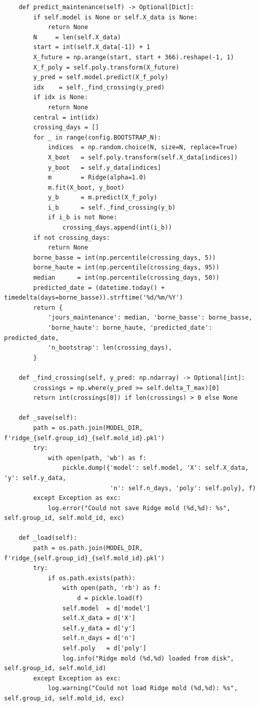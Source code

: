 \begin{lstlisting}
    def predict_maintenance(self) -> Optional[Dict]:
        if self.model is None or self.X_data is None:
            return None
        N     = len(self.X_data)
        start = int(self.X_data[-1]) + 1
        X_future = np.arange(start, start + 366).reshape(-1, 1)
        X_f_poly = self.poly.transform(X_future)
        y_pred = self.model.predict(X_f_poly)
        idx    = self._find_crossing(y_pred)
        if idx is None:
            return None
        central = int(idx)
        crossing_days = []
        for _ in range(config.BOOTSTRAP_N):
            indices  = np.random.choice(N, size=N, replace=True)
            X_boot   = self.poly.transform(self.X_data[indices])
            y_boot   = self.y_data[indices]
            m        = Ridge(alpha=1.0)
            m.fit(X_boot, y_boot)
            y_b      = m.predict(X_f_poly)
            i_b      = self._find_crossing(y_b)
            if i_b is not None:
                crossing_days.append(int(i_b))
        if not crossing_days:
            return None
        borne_basse = int(np.percentile(crossing_days, 5))
        borne_haute = int(np.percentile(crossing_days, 95))
        median      = int(np.percentile(crossing_days, 50))
        predicted_date = (datetime.today() + timedelta(days=borne_basse)).strftime('%d/%m/%Y')
        return {
            'jours_maintenance': median, 'borne_basse': borne_basse,
            'borne_haute': borne_haute, 'predicted_date': predicted_date,
            'n_bootstrap': len(crossing_days),
        }

    def _find_crossing(self, y_pred: np.ndarray) -> Optional[int]:
        crossings = np.where(y_pred >= self.delta_T_max)[0]
        return int(crossings[0]) if len(crossings) > 0 else None

    def _save(self):
        path = os.path.join(MODEL_DIR, f'ridge_{self.group_id}_{self.mold_id}.pkl')
        try:
            with open(path, 'wb') as f:
                pickle.dump({'model': self.model, 'X': self.X_data, 'y': self.y_data,
                             'n': self.n_days, 'poly': self.poly}, f)
        except Exception as exc:
            log.error("Could not save Ridge mold (%d,%d): %s", self.group_id, self.mold_id, exc)

    def _load(self):
        path = os.path.join(MODEL_DIR, f'ridge_{self.group_id}_{self.mold_id}.pkl')
        try:
            if os.path.exists(path):
                with open(path, 'rb') as f:
                    d = pickle.load(f)
                self.model  = d['model']
                self.X_data = d['X']
                self.y_data = d['y']
                self.n_days = d['n']
                self.poly   = d['poly']
                log.info("Ridge mold (%d,%d) loaded from disk", self.group_id, self.mold_id)
        except Exception as exc:
            log.warning("Could not load Ridge mold (%d,%d): %s", self.group_id, self.mold_id, exc)
\end{lstlisting}

